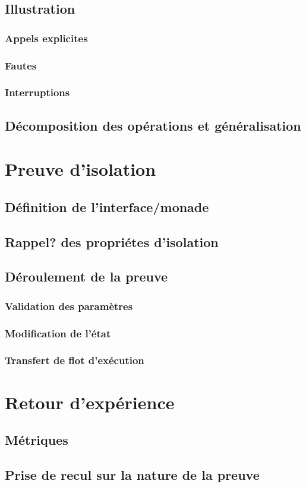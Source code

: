 		\subsection{Illustration}
			\subsubsection{Appels explicites}
			\subsubsection{Fautes}
			\subsubsection{Interruptions}

		\subsection{Décomposition des opérations et généralisation}

	\section{Preuve d'isolation}
		\subsection{Définition de l'interface/monade}
		\subsection{Rappel? des propriétes d'isolation}
		
		\subsection{Déroulement de la preuve}
			\subsubsection{Validation des paramètres}
			\subsubsection{Modification de l'état}
			\subsubsection{Transfert de flot d'exécution}

	\section{Retour d'expérience}
		\subsection{Métriques}
		\subsection{Prise de recul sur la nature de la preuve}
